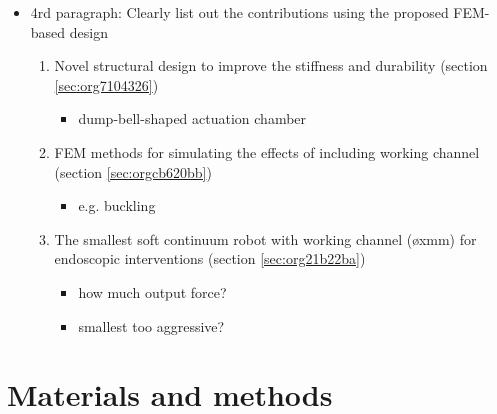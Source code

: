 \documentclass[journal,onecolumn]{IEEEtran}
\begin{document}
\begin{itemize}
\begin{itemize}
\item 4rd paragraph: Clearly list out the contributions using the proposed FEM-based design 
\begin{enumerate}
\item Novel structural design to improve the stiffness and durability (section \ref{sec:org7104326})
\begin{itemize}
\item dump-bell-shaped actuation chamber
\end{itemize}
\item FEM methods for simulating the effects of including working channel (section \ref{sec:orgcb620bb})
\begin{itemize}
\item e.g. buckling
\end{itemize}
\item The smallest soft continuum robot with working channel (øxmm) for endoscopic interventions (section \ref{sec:org21b22ba})
\begin{itemize}
\item how much output force?
\item smallest too aggressive?
\end{itemize}
\end{enumerate}
\end{itemize}
\end{itemize}


\section{Materials and methods}
\label{sec:org5257bcd}
\end{document}
